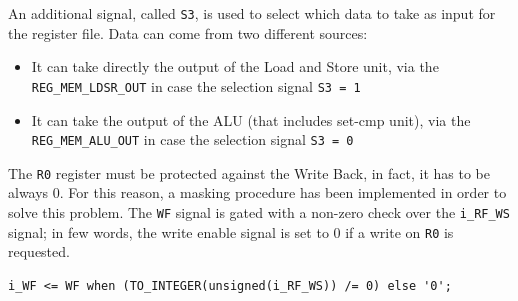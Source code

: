 An additional signal, called \texttt{S3}, is used to select which data to take as input for the register file. Data can come from two different sources:
\begin{itemize}
    \itemsep0sp
    \item It can take directly the output of the Load and Store unit, via the \texttt{REG\_MEM\_LDSR\_OUT} in case the selection signal \texttt{S3 = 1}
    \item It can take the output of the ALU (that includes set-cmp unit), via the \texttt{REG\_MEM\_ALU\_OUT} in case the selection signal \texttt{S3 = 0}
\end{itemize}

The \texttt{R0} register must be protected against the Write Back, in fact, it has to be always 0. For this reason, a masking procedure has been implemented in order to solve this problem. The \texttt{WF} signal is gated with a non-zero check over the \texttt{i\_RF\_WS} signal; in few words, the write enable signal is set to 0 if a write on \texttt{R0} is requested.

\hfill
\begin{lstlisting}[style=vhdl,caption={VHDL code gating for the WS signal coming from the CU}]
    i_WF <= WF when (TO_INTEGER(unsigned(i_RF_WS)) /= 0) else '0';
\end{lstlisting}